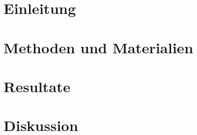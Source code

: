 \documentclass[
  a4paper,
  bibliography=totoc,
  listof=totoc,
  invert-title,
  titleimage-ratio=13
]{bfhpub}
\begin{document}
\clearpage
\section{Einleitung}


\clearpage
\section{Methoden und Materialien}


\clearpage
\section{Resultate}


\clearpage
\section{Diskussion}


\clearpage
\printbibliography

\clearpage
\listoffigures
 
\clearpage
\listoftables


\clearpage
\printglossary[type=main]
\printglossary[type=acronym]

\clearpage
\printindex

\appendix
\end{document}
